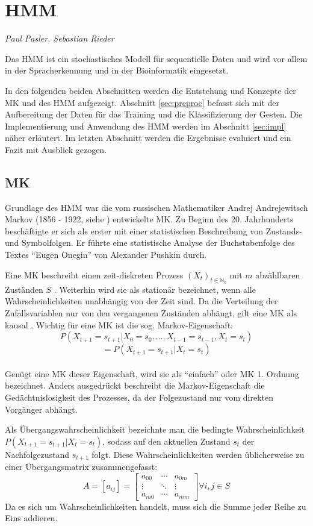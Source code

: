 ﻿\section{\acl{HMM}}
\label{mainsec:hmm}
\textit{Paul Pasler, Sebastian Rieder}

Das \acl{HMM} ist ein stochastisches Modell für sequentielle Daten und wird vor allem in der Spracherkennung und in der Bioinformatik eingesetzt.

In den folgenden beiden Abschnitten werden die Entstehung und Konzepte der \acl{MK} und des \acl{HMM} aufgezeigt.
Abschnitt \ref{sec:preproc} befasst sich mit der Aufbereitung der Daten für das Training und die Klassifizierung der Gesten.
Die Implementierung und Anwendung des \acl{HMM} werden im Abschnitt \ref{sec:impl} näher erläutert. Im letzten Abschnitt werden die Ergebnisse 
evaluiert und ein Fazit mit Ausblick gezogen.  
 
\subsection{\acl{MK}} \label{sec:chain}
Grundlage des \acl{HMM} war die vom russischen Mathematiker Andrej Andrejewitsch Markov 
(1856 - 1922, siehe \cite{markov1913}) entwickelte \acl{MK}. Zu Beginn des
20. Jahrhunderts beschäftigte er sich als erster mit einer statistischen Beschreibung von Zustands- und Symbolfolgen. 
Er führte eine statistische Analyse der Buchstabenfolge des Textes ``Eugen Onegin'' von Alexander 
Pushkin durch.

Eine \acl{MK} beschreibt einen zeit-diskreten Prozess \((X_t)_{t\in\mathbb{N}_0}\) mit  \(m\) abzählbaren Zuständen \(S\) \cite{stochMod}.
Weiterhin wird sie als stationär bezeichnet, wenn alle Wahrscheinlichkeiten unabhängig von der Zeit sind.
Da die Verteilung der Zufallsvariablen nur von den vergangenen Zuständen abhängt, gilt eine \acl{MK} als kausal \cite[48]{mmmFink}.
Wichtig für eine \acl{MK} ist die sog. Markov-Eigenschaft:
\[ P (X_{t+1} = s_{t+1} | X_0 = s_0, \ldots , X_{t-1} = s_{t-1}, X_{t} = s_{t}) \]
\[ = P ( X_{t+1} = s_{t+1} | X_{t} = s_{t} ) \] \\
Genügt eine \acl{MK} dieser Eigenschaft, wird sie als ``einfach'' oder \acl{MK} 1. Ordnung bezeichnet.
Anders ausgedrückt beschreibt die Markov-Eigenschaft die Gedächtnislosigkeit des Prozesses, da der Folgezustand nur vom direkten Vorgänger abhängt.

Als Übergangswahrscheinlichkeit bezeichnte man die bedingte Wahrscheinlichkeit \(P ( X_{t+1} = s_{t+1} | X_{t} = s_{t} ) \), sodass auf 
den aktuellen Zustand \( s_{t}\) der Nachfolgezustand \( s_{t+1}\) folgt. Diese Wahrscheinlichkeiten werden üblicherweise zu einer Übergangsmatrix zusammengefasst: 
\[ A = [a_{ij}] =
\begin {bmatrix} 
  a_{00}&\cdots&a_{0m} \\
  \vdots&\ddots&\vdots \\
  a_{m0}&\cdots&a_{mm}
 \end {bmatrix} \forall i, j \in S \]
Da es sich um Wahrscheinlichkeiten handelt, muss sich die Summe jeder Reihe zu Eins addieren. \\

